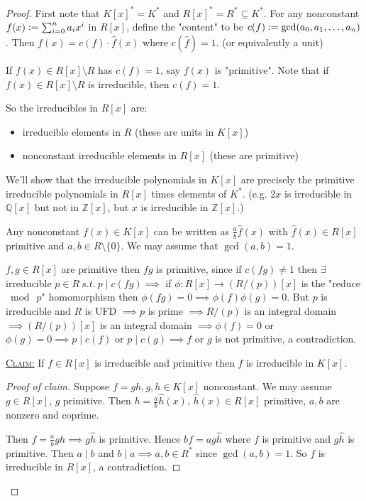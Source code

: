 \documentclass{article}
\newcommand{\Z}{\mathbb{Z}}
\newcommand{\Q}{\mathbb{Q}}
\newcommand{\st}{\ s.t.\ }
\newcommand{\defeq}{\vcentcolon=}
\newcommand{\fancyem}[1]{\underline{\textsc{#1}}}
\theoremstyle{definition}
\theoremstyle{remark}
\begin{document}
\begin{proof}
    First note that $K[x]^* = K^*$ and $R[x]^* = R^* \subseteq K^*$. For any nonconstant $f(x) \defeq \sum_{i=0}^n a_ix^i$ in $R[x]$, define the "content" to be $c(f)\defeq \gcd(a_0, a_1, \ldots, a_n)$. Then $f(x) = c(f)\cdot \hat{f}(x)$ where $c(\hat{f}) = 1$. (or equivalently a unit)

    If $f(x) \in R[x] \setminus R$ has $c(f) = 1$, say $f(x)$ is "primitive". Note that if $f(x) \in R[x] \setminus R$ is irreducible, then $c(f) = 1$.

    So the irreducibles in $R[x]$ are:
    \begin{itemize}
        \item irreducible elements in $R$ (these are units in $K[x]$)
        \item nonconstant irreducible elements in $R[x]$ (these are primitive)
    \end{itemize}

    We'll show that the irreducible polynomials in $K[x]$ are precisely the primitive irreducible polynomials in $R[x]$ times elements of $K^*$.
    (e.g. $2x$ is irreducible in $\Q[x]$ but not in $\Z[x]$, but $x$ is irreducible in $\Z[x]$.)

    Any nonconstant $f(x) \in K[x]$ can be written as $\frac{a}{b} \hat{f}(x)$ with $\hat{f}(x) \in R[x]$ primitive and $a, b \in R \setminus \{0\}$. We may assume that $\gcd(a, b) = 1$.

    $f, g \in R[x]$ are primitive then $fg$ is primitive, since if $c(fg) \neq 1$ then $\exists$ irreducible $p \in R \st p \mid c(fg) \implies$ if $\phi: R[x] \to (R/(p))[x]$ is the "reduce $\bmod\ p$" homomorphism then $\phi(fg) = 0 \implies \phi(f)\phi(g) = 0$. But $p$ is irreducible and $R$ is UFD $\implies p$ is prime $\implies R/(p)$ is an integral domain $\implies (R/(p))[x]$ is an integral domain $\implies \phi(f) = 0$ or $\phi(g) = 0 \implies p \mid c(f)$ or $p \mid c(g) \implies f$ or $g$ is not primitive, a contradiction.
    
    \fancyem{Claim:} If $f \in R[x]$ is irreducible and primitive then $f$ is irreducible in $K[x]$.

    \begin{proof}[Proof of claim]\let\qed\relax
        Suppose $f = gh, g, h \in K[x]$ nonconstant. We may assume $g \in R[x]$, $g$ primitive. Then $h = \frac{a}{b}\hat{h}(x)$, $\hat{h}(x) \in R[x]$ primitive, $a, b$ are nonzero and coprime.

        Then $f = \frac{a}{b}g\hat{h} \implies g\hat{h}$ is primitive. Hence $bf = ag\hat{h}$ where $f$ is primitive and $g\hat{h}$ is primitive. Then $a \mid b$ and $b \mid a \implies a, b \in R^*$ since $\gcd(a, b) = 1$. So $f$ is irreducible in $R[x]$, a contradiction.
    \end{proof}


\end{proof}
\end{document}
